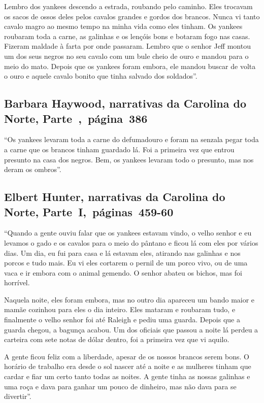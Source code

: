 Lembro dos yankees descendo a estrada, roubando pelo caminho. Eles
trocavam os sacos de ossos deles pelos cavalos grandes e gordos dos
brancos. Nunca vi tanto cavalo magro ao mesmo tempo na minha vida como
eles tinham. Os yankees roubaram toda a carne, as galinhas e os lençóis
bons e botaram fogo nas casas. Fizeram maldade à farta por onde
passaram. Lembro que o senhor Jeff montou um dos seus negros no seu
cavalo com um bule cheio de ouro e mandou para o meio do mato. Depois
que os yankees foram embora, ele mandou buscar de volta o ouro e aquele
cavalo bonito que tinha salvado dos soldados''.

\subsection{Barbara Haywood, narrativas da Carolina do Norte, Parte~,~página~386}
\label{ref133}

``Os yankees levaram toda a carne do defumadouro e foram na senzala
pegar toda a carne que os brancos tinham guardado lá. Foi a primeira vez
que entrou presunto na casa dos negros. Bem, os yankees levaram todo o
presunto, mas nos deram os ombros''.

\subsection{Elbert Hunter, narrativas da Carolina do Norte, Parte~I,~páginas~459-60}
\label{ref156}

``Quando a gente ouviu falar que os yankees estavam vindo, o velho
senhor e eu levamos o gado e os cavalos para o meio do pântano e ficou
lá com eles por vários dias. Um dia, eu fui para casa e lá estavam eles,
atirando nas galinhas e nos porcos e tudo mais. Eu vi eles cortarem o
pernil de um porco vivo, ou de uma vaca e ir embora com o animal
gemendo. O senhor abateu os bichos, mas foi horrível.

Naquela noite, eles foram embora, mas no outro dia apareceu um bando
maior e mamãe cozinhou para eles o dia inteiro. Eles mataram e roubaram
tudo, e finalmente o velho senhor foi até Raleigh e pediu uma guarda.
Depois que a guarda chegou, a bagunça acabou. Um dos oficiais que passou
a noite lá perdeu a carteira com sete notas de dólar dentro, foi a
primeira vez que vi aquilo.

A gente ficou feliz com a liberdade, apesar de os nossos brancos serem
bons. O horário de trabalho era desde o sol nascer até a noite e as
mulheres tinham que cardar e fiar um certo tanto todas as noites. A
gente tinha as nossas galinhas e uma roça e dava para ganhar um pouco de
dinheiro, mas não dava para se divertir''.

